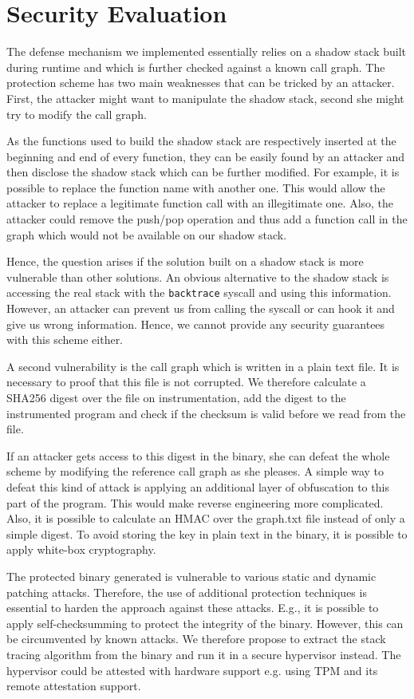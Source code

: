 \documentclass{llncs}
\begin{document}
\section{Security Evaluation}
The defense mechanism we implemented essentially relies on a shadow stack built during runtime and which is further checked against a known call graph. The protection scheme has two main weaknesses that can be tricked by an attacker. First, the attacker might want to manipulate the shadow stack, second she might try to modify the call graph.

As the functions used to build the shadow stack are respectively inserted at the beginning and end of every function, they can be easily found by an attacker and then disclose the shadow stack which can be further modified. For example, it is possible to replace the function name with another one. This would allow the attacker to replace a legitimate function call with an illegitimate one. Also, the attacker could remove the push/pop operation and thus add a function call in the graph which would not be available on our shadow stack.

Hence, the question arises if the solution built on a shadow stack is more vulnerable than other solutions. An obvious alternative to the shadow stack is accessing the real stack with the \texttt{backtrace} syscall and using this information. However, an attacker can prevent us from calling the syscall or can hook it and give us wrong information. Hence, we cannot provide any security guarantees with this scheme either.

A second vulnerability is the call graph which is written in a plain text file. It is necessary to proof that this file is not corrupted. We therefore calculate a SHA256 digest over the file on instrumentation, add the digest to the instrumented program and check if the checksum is valid before we read from the file.

If an attacker gets access to this digest in the binary, she can defeat the whole scheme by modifying the reference call graph as she pleases.
A simple way to defeat this kind of attack is applying an additional layer of obfuscation to this part of the program. This would make reverse engineering more complicated.
Also, it is possible to calculate an HMAC over the graph.txt file instead of only a simple digest. To avoid storing the key in plain text in the binary, it is possible to apply white-box cryptography.

The protected binary generated is vulnerable to various static and dynamic patching attacks. Therefore, the use of additional protection techniques is essential to harden the approach against these attacks. E.g., it is possible to apply self-checksumming to protect the integrity of the binary. However, this can be circumvented by known attacks. We therefore propose to extract the stack tracing algorithm from the binary and run it in a secure hypervisor instead. The hypervisor could be attested with hardware support e.g. using TPM and its remote attestation support.
\end{document}
